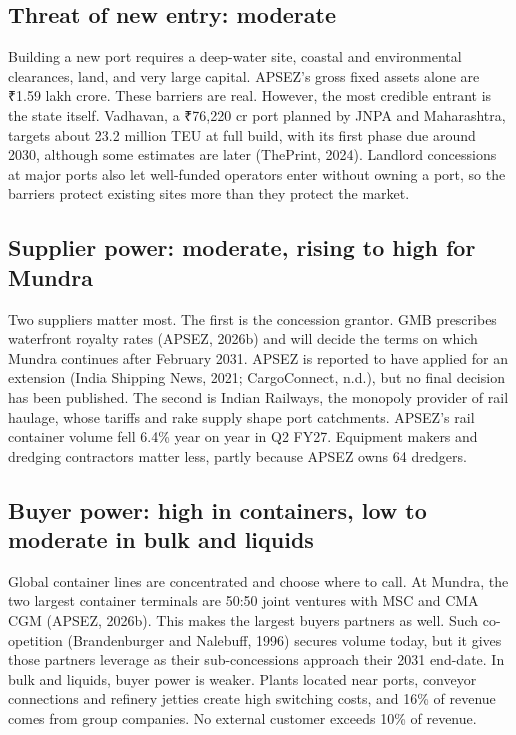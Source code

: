 \documentclass[12pt, a4paper]{article}
\begin{document}
\subsection{Threat of new entry: moderate}
Building a new port requires a deep-water site, coastal and environmental
clearances, land, and very large capital. APSEZ's gross fixed assets alone are
₹1.59 lakh crore. These barriers are real. However, the most credible entrant
is the state itself. Vadhavan, a ₹76,220 cr port planned by JNPA and
Maharashtra, targets about 23.2 million TEU at full build, with its first phase
due around 2030, although some estimates are later (ThePrint, 2024). Landlord
concessions at major ports also let well-funded operators enter without owning
a port, so the barriers protect existing sites more than they protect the
market.

\subsection{Supplier power: moderate, rising to high for Mundra}
Two suppliers matter most. The first is the concession grantor. GMB prescribes
waterfront royalty rates (APSEZ, 2026b) and will decide the terms on which
Mundra continues after February 2031. APSEZ is reported to have applied for an
extension (India Shipping News, 2021; CargoConnect, n.d.), but no final decision
has been published. The second is Indian Railways, the monopoly provider of
rail haulage, whose tariffs and rake supply shape port catchments. APSEZ's rail
container volume fell 6.4\% year on year in Q2 FY27. Equipment makers and
dredging contractors matter less, partly because APSEZ owns 64 dredgers.

\subsection{Buyer power: high in containers, low to moderate in bulk and liquids}
Global container lines are concentrated and choose where to call. At Mundra,
the two largest container terminals are 50:50 joint ventures with MSC and CMA
CGM (APSEZ, 2026b). This makes the largest buyers partners as well. Such
co-opetition (Brandenburger and Nalebuff, 1996) secures volume today, but it
gives those partners leverage as their sub-concessions approach their 2031
end-date. In bulk and liquids, buyer power is weaker. Plants located near
ports, conveyor connections and refinery jetties create high switching costs,
and 16\% of revenue comes from group companies. No external customer exceeds
10\% of revenue.
\end{document}
